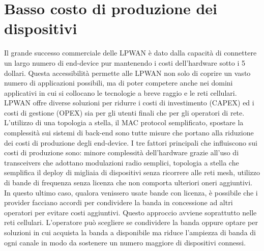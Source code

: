 \documentclass[12pt,a4paper,openright,twoside]{report}
\begin{document}
\section{Basso costo di produzione dei dispositivi}
Il grande successo commerciale delle LPWAN \`e dato dalla capacit\`a di connettere un largo numero di end-device pur mantenendo i costi dell'hardware sotto i 5 dollari. \cite{K3}\cite{K4}
Questa accessibilit\`a permette alle LPWAN non solo di coprire un vasto numero di applicazioni possibili, ma di poter competere anche nei domini applicativi in cui si collocano le tecnologie a breve raggio e le reti cellulari. 
LPWAN offre diverse soluzioni per ridurre i costi di investimento (CAPEX) ed i costi di gestione (OPEX) sia per gli utenti finali che per gli operatori di rete. 
L'utilizzo di una topologia a stella, il MAC protocol semplificato, spostare la complessit\`a sui sistemi di back-end sono tutte misure che portano alla riduzione dei costi di produzione degli end-device. 
I tre fattori principali che influiscono sui costi di produzione sono: minore complessit\`a dell'hardware grazie all'uso di transceivers che adottano modulazioni radio semplici, topologia a stella che semplifica il deploy di migliaia di dispositivi senza ricorrere alle reti mesh, utilizzo di bande di frequenza senza licenza che non comporta ulteriori oneri aggiuntivi. 
In questo ultimo caso, qualora venissero usate bande con licenza, \`e possibile che i provider facciano accordi per condividere la banda in concessione ad altri operatori per evitare costi aggiuntivi. 
Questo approccio avviene soprattutto nelle reti cellulari. L'operatore pu\`o scegliere se condividere la banda oppure optare per soluzioni in cui acquista la banda a disponibile ma riduce l'ampiezza di banda di ogni canale in modo da sostenere un numero maggiore di dispositivi connessi. 
\end{document}
